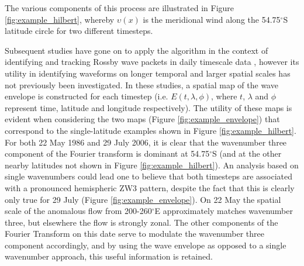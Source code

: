 The various components of this process are illustrated in Figure \ref{fig:example_hilbert}, whereby $\upsilon(x)$ is the meridional wind along the 54.75$^{\circ}$S latitude circle for two different timesteps. 

Subsequent studies have gone on to apply the \citet{Zimin2003} algorithm in the context of identifying and tracking Rossby wave packets in daily timescale data \citep{Glatt2014,Souders2014a}, however its utility in identifying waveforms on longer temporal and larger spatial scales has not previously been investigated. In these studies, a spatial map of the wave envelope is constructed for each timestep (i.e. $E(t,\lambda,\phi)$, where $t$, $\lambda$ and $\phi$ represent time, latitude and longitude respectively). The utility of these maps is evident when considering the two maps (Figure \ref{fig:example_envelope}) that correspond to the single-latitude examples shown in Figure \ref{fig:example_hilbert}. For both 22 May 1986 and 29 July 2006, it is clear that the wavenumber three component of the Fourier transform is dominant at 54.75$^{\circ}$S (and at the other nearby latitudes not shown in Figure \ref{fig:example_hilbert}). An analysis based on single wavenumbers could lead one to believe that both timesteps are associated with a pronounced hemispheric ZW3 pattern, despite the fact that this is clearly only true for 29 July (Figure \ref{fig:example_envelope}). On 22 May the spatial scale of the anomalous flow from 200-260$^{\circ}$E approximately matches wavenumber three, but elsewhere the flow is strongly zonal. The other components of the Fourier Transform on this date serve to modulate the wavenumber three component accordingly, and by using the wave envelope as opposed to a single wavenumber approach, this useful information is retained.